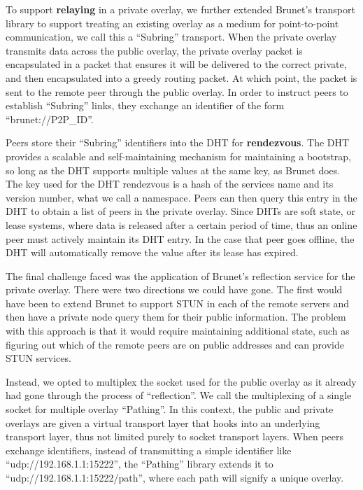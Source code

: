 \documentclass[conference]{IEEEtran}
\begin{document}
To support \textbf{relaying} in a private overlay, we further extended Brunet's
transport library to support treating an existing overlay as a medium for
point-to-point communication, we call this a ``Subring'' transport.  When the
private overlay transmits data across the public overlay, the private overlay
packet is encapsulated in a packet that ensures it will be delivered to the
correct private, and then encapsulated into a greedy routing packet.  At which
point, the packet is sent to the remote peer through the public overlay.  In
order to instruct peers to establish ``Subring'' links, they exchange an
identifier of the form ``brunet://P2P\_ID''.

Peers store their ``Subring'' identifiers into the DHT for \textbf{rendezvous}.
The DHT provides a scalable and self-maintaining mechanism for maintaining a
bootstrap, so long as the DHT supports multiple values at the same key, as
Brunet does.  The key used for the DHT rendezvous is a hash of the services
name and its version number, what we call a namespace.  Peers can then query
this entry in the DHT to obtain a list of peers in the private overlay.  Since
DHTs are soft state, or lease systems, where data is released after a certain
period of time, thus an online peer must actively maintain its DHT entry.  In
the case that peer goes offline, the DHT will automatically remove the value
after its lease has expired.

The final challenge faced was the application of Brunet's reflection service
for the private overlay.  There were two directions we could have gone.  The
first would have been to extend Brunet to support STUN in each of the remote
servers and then have a private node query them for their public information.
The problem with this approach is that it would require maintaining additional
state, such as figuring out which of the remote peers are on public addresses
and can provide STUN services.

Instead, we opted to multiplex the socket used for the public overlay as it
already had gone through the process of ``reflection''.  We call the
multiplexing of a single socket for multiple overlay ``Pathing''.  In this
context, the public and private overlays are given a virtual transport layer
that hooks into an underlying transport layer, thus not limited purely to
socket transport layers.  When peers exchange identifiers, instead of
transmitting a simple identifier like ``udp://192.168.1.1:15222'', the
``Pathing'' library extends it to ``udp://192.168.1.1:15222/path'', where each
path will signify a unique overlay.
\end{document}

